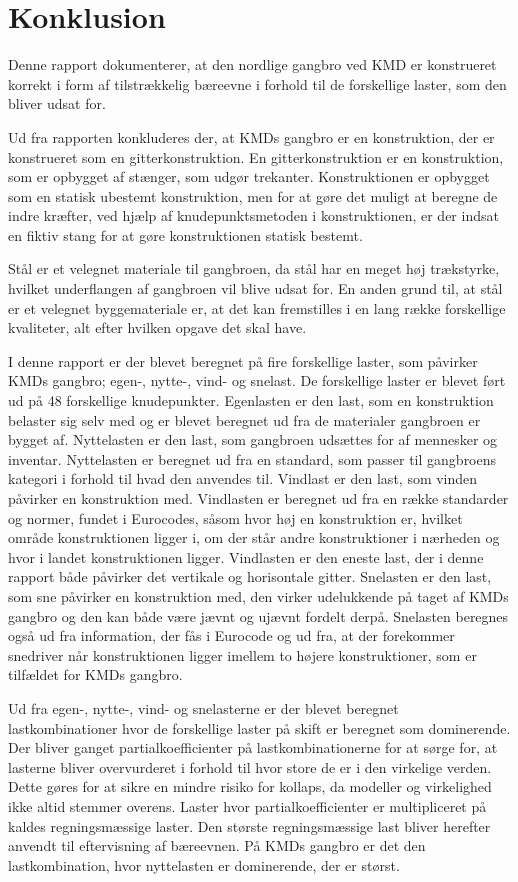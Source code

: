 \chapter{Konklusion}
Denne rapport dokumenterer, at den nordlige gangbro ved KMD er konstrueret korrekt i form af tilstrækkelig bæreevne i forhold til de forskellige laster, som den bliver udsat for. 

Ud fra rapporten konkluderes der, at KMDs gangbro er en konstruktion, der er konstrueret som en gitterkonstruktion. En gitterkonstruktion er en konstruktion, som er opbygget af stænger, som udgør trekanter. Konstruktionen er opbygget som en statisk ubestemt konstruktion, men for at gøre det muligt at beregne de indre kræfter, ved hjælp af knudepunktsmetoden i konstruktionen, er der indsat en fiktiv stang for at gøre konstruktionen statisk bestemt.  

Stål er et velegnet materiale til gangbroen, da stål har en meget høj trækstyrke, hvilket underflangen af gangbroen vil blive udsat for. En anden grund til, at stål er et velegnet byggemateriale er, at det kan fremstilles i en lang række forskellige kvaliteter, alt efter hvilken opgave det skal have.

I denne rapport er der blevet beregnet på fire forskellige laster, som påvirker KMDs gangbro; egen-, nytte-, vind- og snelast. De forskellige laster er blevet ført ud på 48 forskellige knudepunkter. Egenlasten er den last, som en konstruktion belaster sig selv med og er blevet beregnet ud fra de materialer gangbroen er bygget af. Nyttelasten er den last, som gangbroen udsættes for af mennesker og inventar. Nyttelasten er beregnet ud fra en standard, som passer til gangbroens kategori i forhold til hvad den anvendes til. Vindlast er den last, som vinden påvirker en konstruktion med. Vindlasten er beregnet ud fra en række standarder og normer, fundet i Eurocodes, såsom hvor høj en konstruktion er, hvilket område konstruktionen ligger i, om der står andre konstruktioner i nærheden og hvor i landet konstruktionen ligger. Vindlasten er den eneste last, der i denne rapport både påvirker det vertikale og horisontale gitter. Snelasten er den last, som sne påvirker en konstruktion med, den virker udelukkende på taget af KMDs gangbro og den kan både være jævnt og ujævnt fordelt derpå. Snelasten beregnes også ud fra information, der fås i Eurocode og ud fra, at der forekommer snedriver når konstruktionen ligger imellem to højere konstruktioner, som er tilfældet for KMDs gangbro. 

Ud fra egen-, nytte-, vind- og snelasterne er der blevet beregnet lastkombinationer hvor de forskellige laster på skift er beregnet som dominerende. Der bliver ganget partialkoefficienter på lastkombinationerne for at sørge for, at lasterne bliver overvurderet i forhold til hvor store de er i den virkelige verden. Dette gøres for at sikre en mindre risiko for kollaps, da modeller og virkelighed ikke altid stemmer overens. Laster hvor partialkoefficienter er multipliceret på kaldes regningsmæssige laster. Den største regningsmæssige last bliver herefter anvendt til eftervisning af bæreevnen. På KMDs gangbro er det den lastkombination, hvor nyttelasten er dominerende, der er størst. 


